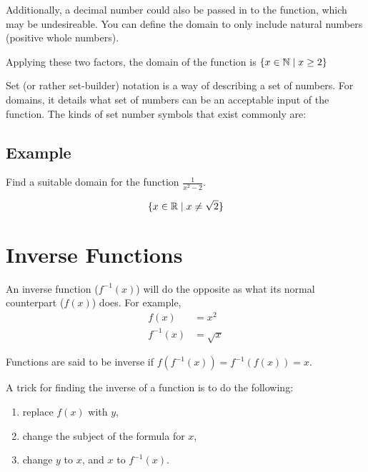 Additionally, a decimal number could also be passed in to the function, which may be undesireable. You can define the domain to only include natural numbers (positive whole numbers).

Applying these two factors, the domain of the function is $\{x \in \mathbb{N} \mid x \geq 2\}$

Set (or rather set-builder) notation is a way of describing a set of numbers. For domains, it details what set of numbers can be an acceptable input of the function. The kinds of set number symbols that exist commonly are:

\subsection{Example}
Find a suitable domain for the function $$.

\begin{equation*}
	\{x \in \mathbb{R} \mid x \neq \sqrt{2}\}
\end{equation*}


\section{Inverse Functions}
An inverse function ($f^{-1}(x)$) will do the opposite as what its normal counterpart ($f(x)$) does. For example,
\begin{align*}
	f(x) &= x^2\\
	f^{-1}(x)&=\sqrt{x}
\end{align*}

Functions are said to be inverse if $f\left(f^{-1}(x)\right) = f^{-1}\left(f(x)\right)=x$.

A trick for finding the inverse of a function is to do the following:
\begin{enumerate}
	\item replace $f(x)$ with $y$,
	\item change the subject of the formula for $x$,
	\item change $y$ to $x$, and $x$ to $f^{-1}(x)$.
\end{enumerate}


